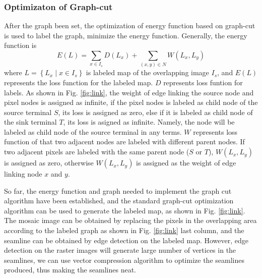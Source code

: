 \documentclass[journal]{IEEEtran}
\begin{document}
\subsubsection{Optimizaton of Graph-cut}
After the graph been set, the optimization of energy function based on graph-cut is used to label the graph, minimize the energy function. Generally, the energy function is
\begin{equation}\label{eq5}
E(L)=\sum_{x\in I_s} D(L_x)+\sum_{(x,y)\in N} W(L_x,L_y)
\end{equation}
where $L=\left \{ L_{x}\mid x\in I_s \right \}$ is labeled map of the overlapping image $I_s$, and $E(L)$ represents the loss function for the labeled map. $D$ represents loss funtion for labels. As shown in Fig. \ref{fig:link}, the weight of edge linking the source node and pixel nodes is assigned as infinite, if the pixel nodes is labeled as child node of the source terminal $S$, its loss is assigned as zero, else if it is labeled as child node of the sink terminal $T$, its loss is asigned as infinite. Namely, the node will be labeled as child node of the source terminal in any terms. $W$ represents loss function of that two adjacent nodes are labeled with different parent nodes. If two adjacent pixels are labeled with the same parent node ($S$ or $T$), $W(L_x,L_y)$ is assigned as zero, otherwise $W(L_x,L_y)$ is assigned as the weight of edge linking node $x$ and $y$.

So far, the energy function and graph needed to implement the graph cut algorithm have been established, and the standard graph-cut optimization algorithm can be used to generate the labeled map, as shown in Fig. \ref{fig:link}. The mosaic image can be obtained by replacing the pixels in the overlapping area according to the labeled graph as shown in Fig. \ref{fig:link} last column, and the seamline can be obtained by edge detection on the labeled map. However, edge detection on the raster images will generate large number of vertices in the seamlines, we can use vector compression algorithm to optimize the seamlines produced, thus making the seamlines neat.
\end{document}
